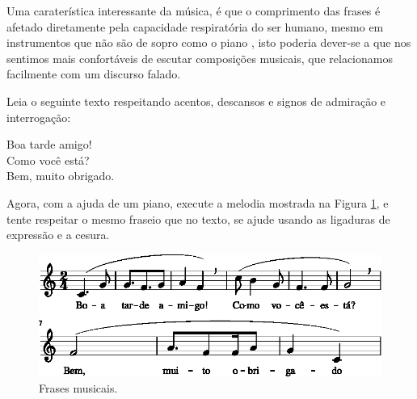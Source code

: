 Uma caraterística interessante da música, 
é que o comprimento das frases é afetado diretamente pela capacidade respiratória do ser humano,
mesmo em instrumentos que não são de sopro como o piano \cite[pp. 48]{howard1991aprendendo},
isto poderia dever-se a que nos sentimos mais confortáveis de escutar composições musicais,
que relacionamos facilmente com um discurso falado.

\begin{example}
Leia  o seguinte texto respeitando acentos, descansos e signos de admiração e interrogação:
\begin{citando}%
Boa tarde amigo!\\
Como você está?\\
Bem, muito obrigado.
\end{citando}%

Agora, com a ajuda de um piano, execute a melodia mostrada na Figura \ref{fig:conversa1},
e tente respeitar o mesmo fraseio que no texto, se ajude usando as ligaduras de expressão e a cesura.
\end{example}

\begin{figure}[!h]
\centering
\includegraphics[width=\textwidth]{chapters/cap-musica-topicos/conversa-1.eps}
\caption{Frases musicais.}
\label{fig:conversa1}
\end{figure}




